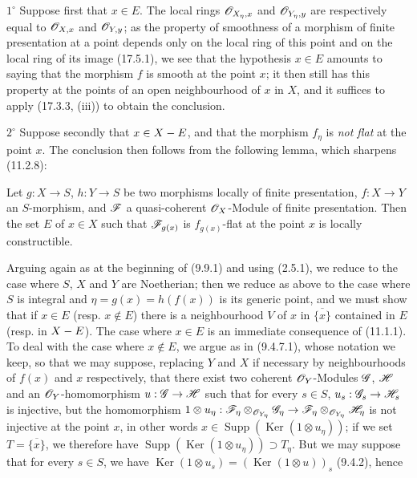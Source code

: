 $1^\circ$ Suppose first that $x\in E$. The local rings $\mathscr{O}_{X_\eta,x}$ and $\mathscr{O}_{Y_\eta,y}$ are respectively equal to $\mathscr{O}_{X,x}$ and $\mathscr{O}_{Y,y}$; as the property of smoothness of a morphism of finite presentation at a point depends only on the local ring of this point and on the local ring of its image (17.5.1), we see that the hypothesis $x\in E$ amounts to saying that the morphism $f$ is smooth at the point $x$; it then still has this property at the points of an open neighbourhood of $x$ in $X$, and it suffices to apply (17.3.3, (iii)) to obtain the conclusion.

$2^\circ$ Suppose secondly that $x\in X- E$, and that the morphism $f_\eta$ is \emph{not flat} at the point $x$. The conclusion then follows from the following lemma, which sharpens (11.2.8):

\begin{lemma}[17.7.11.1]
\label{IV.17.7.11.1}
Let $g:X\to S$, $h:Y\to S$ be two morphisms locally of finite presentation, $f:X\to Y$ an $S$-morphism, and $\mathscr{F}$ a quasi-coherent $\mathscr{O}_X$-Module of finite presentation. Then the set $E$ of $x\in X$ such that $\mathscr{F}_{g(x)}$ is $f_{g(x)}$-flat at the point $x$ is locally constructible.
\end{lemma}

Arguing again as at the beginning of (9.9.1) and using (2.5.1), we reduce to the case where $S$, $X$ and $Y$ are Noetherian; then we reduce as above to the case where $S$ is integral and $\eta=g(x)=h(f(x))$ is its generic point, and we must show that if $x\in E$ (resp. $x\notin E$) there is a neighbourhood $V$ of $x$ in $\overline{\{x\}}$ contained in $E$ (resp. in $X- E$). The case where $x\in E$ is an immediate consequence of (11.1.1). To deal with the case where $x\notin E$, we argue as in (9.4.7.1), whose notation we keep, so that we may suppose, replacing $Y$ and $X$ if necessary by neighbourhoods of $f(x)$ and $x$ respectively, that there exist two coherent $\mathscr{O}_Y$-Modules $\mathscr{G}$, $\mathscr{H}$ and an $\mathscr{O}_Y$-homomorphism $u:\mathscr{G}\to\mathscr{H}$ such that for every $s\in S$, $u_s:\mathscr{G}_s\to\mathscr{H}_s$ is injective, but the homomorphism $1\otimes u_\eta:\mathscr{F}_\eta\otimes_{\mathscr{O}_{Y_\eta}}\mathscr{G}_\eta\to\mathscr{F}_\eta\otimes_{\mathscr{O}_{Y_\eta}}\mathscr{H}_\eta$ is not injective at the point $x$, in other words $x\in\operatorname{Supp}(\operatorname{Ker}(1\otimes u_\eta))$; if we set $T=\overline{\{x\}}$, we therefore have $\operatorname{Supp}(\operatorname{Ker}(1\otimes u_\eta))\supset T_\eta$. But we may suppose that for every $s\in S$, we have $\operatorname{Ker}(1\otimes u_s)=(\operatorname{Ker}(1\otimes u))_s$ (9.4.2), hence

